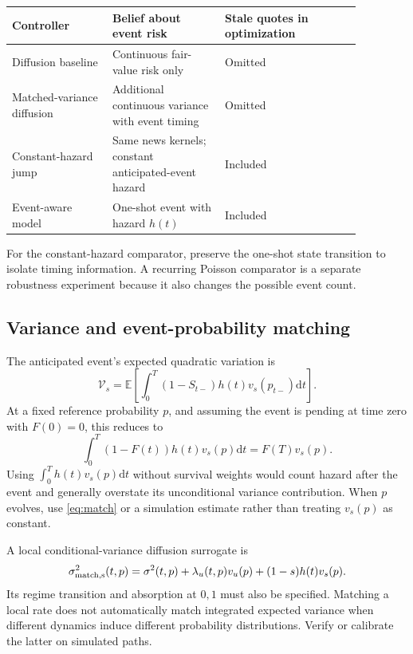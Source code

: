 \documentclass[11pt]{article}
\newcommand{\E}{\mathbb E}
\newcommand{\1}{\mathbf 1}
\newcommand{\dd}{\mathrm d}
\begin{document}
\begin{center}
\small
\begin{tabular}{p{0.25\linewidth}p{0.28\linewidth}p{0.34\linewidth}}
\toprule
Controller & Belief about event risk & Stale quotes in optimization\\
\midrule
Diffusion baseline & Continuous fair-value risk only & Omitted\\
Matched-variance diffusion & Additional continuous variance with event timing & Omitted\\
Constant-hazard jump & Same news kernels; constant anticipated-event hazard & Included\\
Event-aware model & One-shot event with hazard $h(t)$ & Included\\
\bottomrule
\end{tabular}
\end{center}
For the constant-hazard comparator, preserve the one-shot state transition to
isolate timing information. A recurring Poisson comparator is a separate
robustness experiment because it also changes the possible event count.

\subsection{Variance and event-probability matching}
The anticipated event's expected quadratic variation is
\begin{equation}
 \mathcal V_s=
 \E\left[\int_0^T (1-S_{t-})h(t)v_s(p_{t-})\dd t\right].
 \label{eq:match}
\end{equation}
At a fixed reference probability $p$, and assuming the event is pending at
time zero with $F(0)=0$, this reduces to
\begin{equation}
 \int_0^T (1-F(t))h(t)v_s(p)\dd t=F(T)v_s(p).
\end{equation}
Using $\int_0^T h(t)v_s(p)\dd t$ without survival weights would count hazard
after the event and generally overstate its unconditional variance contribution.
When $p$ evolves, use \eqref{eq:match} or a simulation estimate rather than
treating $v_s(p)$ as constant.

A local conditional-variance diffusion surrogate is
\begin{equation}
 \sigma_{\rm match,s}^2(t,p)
 =\sigma^2(t,p)+\lambda_u(t,p)v_u(p)+(1-s)h(t)v_s(p).
\end{equation}
Its regime transition and absorption at $0,1$ must also be specified.
Matching a local rate does not automatically match integrated expected variance
when different dynamics induce different probability distributions. Verify or
calibrate the latter on simulated paths.
\end{document}
